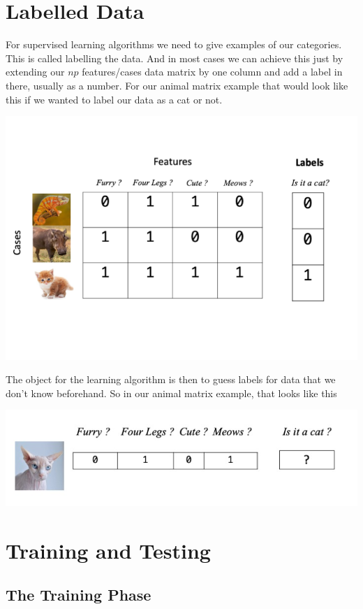 \documentclass[
]{book}
\begin{document}
\hypertarget{labelled-data}{%
\section{Labelled Data}\label{labelled-data}}

For supervised learning algorithms we need to give examples of our categories. This is called labelling the data. And in most cases we can achieve this just by extending our \(np\) features/cases data matrix by one column and add a label in there, usually as a number. For our animal matrix example that would look like this if we wanted to label our data as a cat or not.

\includegraphics{figs/labels.png}

The object for the learning algorithm is then to guess labels for data that we don't know beforehand. So in our animal matrix example, that looks like this

\includegraphics{figs/labels2.png}

\hypertarget{training-and-testing}{%
\section{Training and Testing}\label{training-and-testing}}

\hypertarget{the-training-phase}{%
\subsection{The Training Phase}\label{the-training-phase}}
\end{document}
